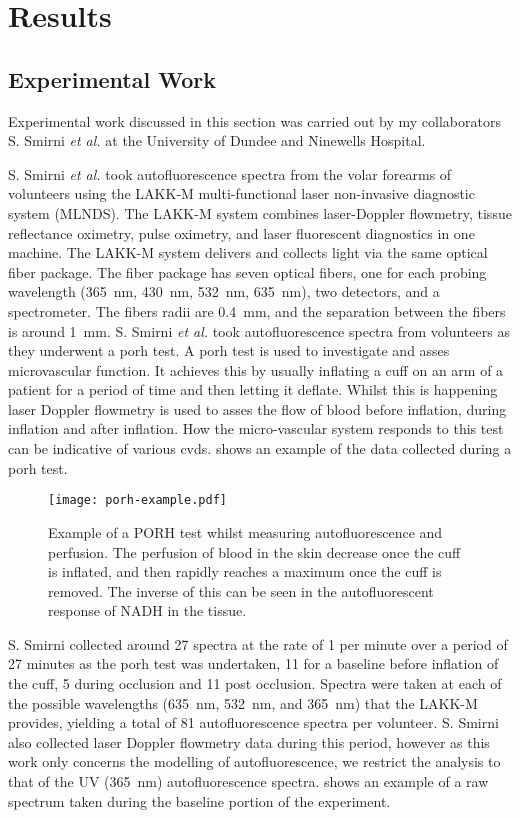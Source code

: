 \FloatBarrier
\section{Results}

\subsection*{Experimental Work}

Experimental work discussed in this section was carried out by my collaborators S. Smirni \textit{et al.} at the University of Dundee and Ninewells Hospital.

S. Smirni \textit{et al.} took autofluorescence spectra from the volar forearms of volunteers using the LAKK-M multi-functional laser non-invasive diagnostic system (MLNDS)\@.
The LAKK-M system combines laser-Doppler flowmetry, tissue reflectance oximetry, pulse oximetry, and laser fluorescent diagnostics in one machine.
The LAKK-M system delivers and collects light via the same optical fiber package.
The fiber package has seven optical fibers, one for each probing wavelength (365~nm, 430~nm, 532~nm, 635~nm), two detectors, and a spectrometer.
The fibers radii are 0.4~mm, and the separation between the fibers is around 1~mm.
S. Smirni \textit{et al.} took autofluorescence spectra from volunteers as they underwent a \gls*{porh} test.
A \gls*{porh} test is used to investigate and asses microvascular function.
It achieves this by usually inflating a cuff on an arm of a patient for a period of time and then letting it deflate.
Whilst this is happening laser Doppler flowmetry is used to asses the flow of blood before inflation, during inflation and after inflation.
How the micro-vascular system responds to this test can be indicative of various \gls*{cvds}.
 shows an example of the data collected during a \gls*{porh} test.


\begin{figure}[!htpb]
  \centering
  \texttt{[image: porh-example.pdf]}
  \caption{Example of a PORH test whilst measuring autofluorescence and perfusion. The perfusion of blood in the skin decrease once the cuff is inflated, and then rapidly reaches a maximum once the cuff is removed. The inverse of this can be seen in the autofluorescent response of NADH in the tissue.}
  \label{fig:porh}
\end{figure}

S. Smirni collected around 27 spectra at the rate of 1 per minute over a period of 27 minutes as the \gls*{porh} test was undertaken, 11 for a baseline before inflation of the cuff, 5 during occlusion and 11 post occlusion.
Spectra were taken at each of the possible wavelengths (635~nm, 532~nm, and 365~nm) that the LAKK-M provides, yielding a total of 81 autofluorescence spectra per volunteer.
S. Smirni also collected laser Doppler flowmetry data during this period, however as this work only concerns the modelling of autofluorescence, we restrict the analysis to that of the UV (365~nm) autofluorescence spectra.
 shows an example of a raw spectrum taken during the baseline portion of the experiment.

